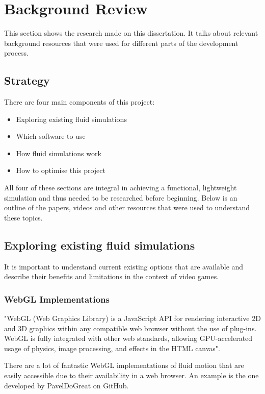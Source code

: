 \documentclass[12pt]{article}
\begin{document}
    \section{Background Review}
    This section shows the research made on this dissertation. It talks about relevant background resources that were used for different parts of the development process.
    
    \subsection{Strategy}
    There are four main components of this project:
    \begin{itemize}
        \item Exploring existing fluid simulations
        \item Which software to use
        \item How fluid simulations work
        \item How to optimise this project
    \end{itemize}
    \sloppy
    All four of these sections are integral in achieving a functional, lightweight simulation and thus needed to be researched before beginning. Below is an outline of the papers, videos and other resources that were used to understand these topics.

    \subsection{Exploring existing fluid simulations}
    It is important to understand current existing options that are available and describe their benefits and limitations in the context of video games.

    \subsubsection{WebGL Implementations}

    "WebGL (Web Graphics Library) is a JavaScript API for rendering interactive 2D and 3D graphics within any compatible web browser without the use of plug-ins. WebGL is fully integrated with other web standards, allowing GPU-accelerated usage of physics, image processing, and effects in the HTML canvas". \cite{webglwikipedia}

    There are a lot of fantastic WebGL implementations of fluid motion that are easily accessible due to their availability in a web browser. An example is the one developed by PavelDoGreat on GitHub.
\end{document}

